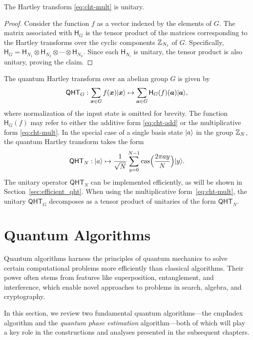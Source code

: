 \documentclass[12pt]{report}
\newcommand{\cas}{\mathrm{cas}}
\newcommand{\cht}{\mathsf{H}}
\newcommand{\qht}{\mathsf{QHT}}
\begin{document}
\begin{lemma}
    The Hartley transform \eqref{eq:cht-mult} is unitary.
\end{lemma}

\begin{proof}
    Consider the function $f$ as a vector indexed by the elements of $G$. The matrix associated with $\cht_G$ is the tensor product of the matrices corresponding to the Hartley transforms over the cyclic components $\mathbb{Z}_{N_i}$ of $G$. Specifically, $\cht_G = \cht_{N_1} \otimes \cht_{N_2} \otimes \cdots \otimes \cht_{N_k}$. Since each $\cht_{N_i}$ is unitary, the tensor product is also unitary, proving the claim.
\end{proof}

The quantum Hartley transform over an abelian group $G$ is given by
\begin{equation}
    \label{eq:qht}
    \qht_G: \sum_{\bm{x} \in G} f(\bm{x}) \ket{\bm{x}} \mapsto \sum_{\bm{a} \in G} \cht_G(f)(\bm{a}) \ket{\bm{a}},
\end{equation}
where normalization of the input state is omitted for brevity. The function $\cht_G(f)$ may refer to either the additive form \eqref{eq:cht-add} or the multiplicative form \eqref{eq:cht-mult}. In the special case of a single basis state $\lvert a\rangle$ in the group $\mathbb{Z}_N$, the quantum Hartley transform takes the form
\begin{equation}
	\label{eq:qht-N}
	\qht_N: \ket{a} \mapsto \frac{1}{\sqrt{N}} \sum_{y = 0}^{N - 1} \cas\Big(\frac{2\pi a y}{N}\Big) \ket{y}.
\end{equation}
The unitary operator $\qht_N$ can be implemented efficiently, as will be shown in Section~\ref{sec:efficient_qht}. When using the multiplicative form~\eqref{eq:cht-mult}, the unitary $\qht_G$ decomposes as a tensor product of unitaries of the form $\qht_N$.
  

\section{Quantum Algorithms}


Quantum algorithms harness the principles of quantum mechanics to solve certain computational problems more efficiently than classical algorithms. Their power often stems from features like superposition, entanglement, and interference, which enable novel approaches to problems in search, algebra, and cryptography.

In this section, we review two fundamental quantum algorithms—the \textsf{cmpIndex} algorithm and the \textit{quantum phase estimation} algorithm—both of which will play a key role in the constructions and analyses presented in the subsequent chapters.
\end{document}
